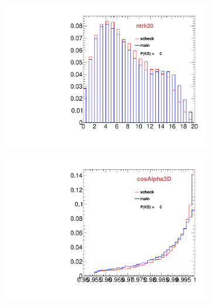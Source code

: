 \begin{figure}
        \centering
        \begin{subfigure}[b]{0.2\textwidth}
                \centering
                \includegraphics[width=\textwidth]{Figures/VariablesComparison/Data_endcaps_figs/closetrk}
                \label{fig:Data_endcaps_closetrk}
        \end{subfigure}
        \begin{subfigure}[b]{0.2\textwidth}
                \centering
                \includegraphics[width=\textwidth]{Figures/VariablesComparison/Data_endcaps_figs/cosa}
                \label{fig:Data_endcaps_cosa}
        \end{subfigure}
        \begin{subfigure}[b]{0.2\textwidth}
                \centering

\end{subfigure}
\end{figure}
